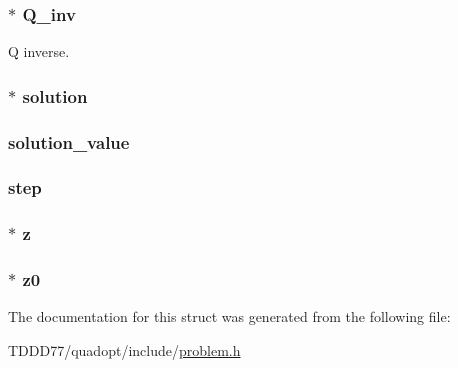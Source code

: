 \subsubsection[{Q\+\_\+inv}]{$\ast$ Q\+\_\+inv}\label{structproblem_a54cc974fe14b21225c2a940ed2bf1039}
Q inverse. \hypertarget{structproblem_a70626c7db657c601438f867391005721}{}
\subsubsection[{solution}]{$\ast$ solution}\label{structproblem_a70626c7db657c601438f867391005721}
\hypertarget{structproblem_a6fcb6ec86b1ba65bd2a34e9a9731c452}{}
\subsubsection[{solution\+\_\+value}]{ solution\+\_\+value}\label{structproblem_a6fcb6ec86b1ba65bd2a34e9a9731c452}
\hypertarget{structproblem_a9c398bc1d126ef3a4cf1efdc9d9f7423}{}
\subsubsection[{step}]{ step}\label{structproblem_a9c398bc1d126ef3a4cf1efdc9d9f7423}
\hypertarget{structproblem_a840058b5c67561185c94da497d0d3da6}{}
\subsubsection[{z}]{$\ast$ z}\label{structproblem_a840058b5c67561185c94da497d0d3da6}
\hypertarget{structproblem_a2f7d9aba872a4653770df8dd6e3826a1}{}
\subsubsection[{z0}]{$\ast$ z0}\label{structproblem_a2f7d9aba872a4653770df8dd6e3826a1}


The documentation for this struct was generated from the following file\+:\begin{DoxyCompactItemize}
\item 
T\+D\+D\+D77/quadopt/include/\hyperlink{problem_8h}{problem.\+h}\end{DoxyCompactItemize}
